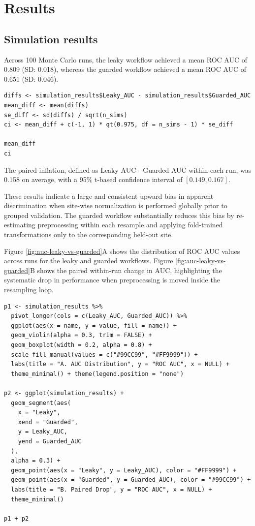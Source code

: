\section{Results}\label{results}

\subsection{Simulation results}\label{sec:simulation-results}

Across 100 Monte Carlo runs, the leaky workflow achieved a mean ROC AUC of 0.809 (SD: 0.018), whereas the guarded workflow achieved a mean ROC AUC of 0.651 (SD: 0.046).

\begin{verbatim}
diffs <- simulation_results$Leaky_AUC - simulation_results$Guarded_AUC
mean_diff <- mean(diffs)
se_diff <- sd(diffs) / sqrt(n_sims)
ci <- mean_diff + c(-1, 1) * qt(0.975, df = n_sims - 1) * se_diff

mean_diff
ci
\end{verbatim}

The paired inflation, defined as Leaky AUC - Guarded AUC within each run, was 0.158 on average, with a 95\% t-based confidence interval of \([0.149, 0.167]\).

These results indicate a large and consistent upward bias in apparent discrimination when site-wise normalization is performed globally prior to grouped validation. The guarded workflow substantially reduces this bias by re-estimating preprocessing within each resample and applying fold-trained transformations only to the corresponding held-out site.

Figure \ref{fig:auc-leaky-vs-guarded}A shows the distribution of ROC AUC values across runs for the leaky and guarded workflows. Figure \ref{fig:auc-leaky-vs-guarded}B shows the paired within-run change in AUC, highlighting the systematic drop in performance when preprocessing is moved inside the resampling loop.

\begin{verbatim}
p1 <- simulation_results %>%
  pivot_longer(cols = c(Leaky_AUC, Guarded_AUC)) %>%
  ggplot(aes(x = name, y = value, fill = name)) +
  geom_violin(alpha = 0.3, trim = FALSE) +
  geom_boxplot(width = 0.2, alpha = 0.8) +
  scale_fill_manual(values = c("#99CC99", "#FF9999")) +
  labs(title = "A. AUC Distribution", y = "ROC AUC", x = NULL) +
  theme_minimal() + theme(legend.position = "none")

p2 <- ggplot(simulation_results) +
  geom_segment(aes(
    x = "Leaky",
    xend = "Guarded",
    y = Leaky_AUC,
    yend = Guarded_AUC
  ),
  alpha = 0.3) +
  geom_point(aes(x = "Leaky", y = Leaky_AUC), color = "#FF9999") +
  geom_point(aes(x = "Guarded", y = Guarded_AUC), color = "#99CC99") +
  labs(title = "B. Paired Drop", y = "ROC AUC", x = NULL) +
  theme_minimal()

p1 + p2
\end{verbatim}

